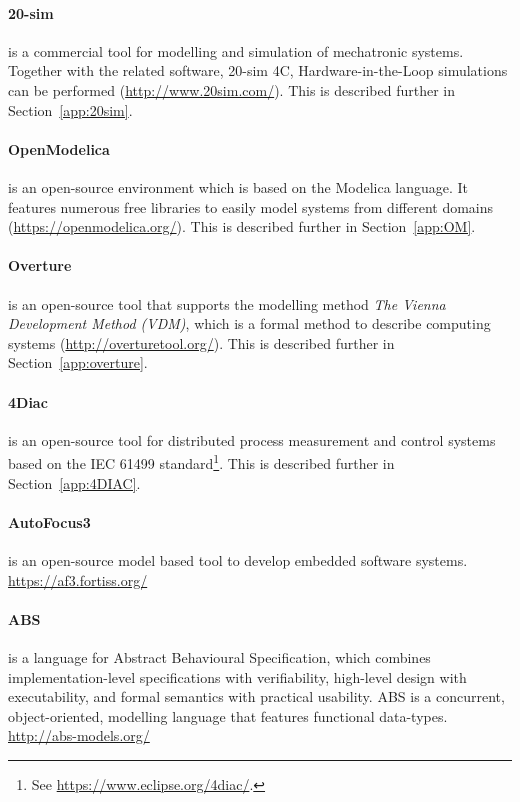 \paragraph{20-sim} is a commercial tool for modelling and simulation of mechatronic systems. Together with the related software, 20-sim 4C, Hardware-in-the-Loop simulations can be performed (\url{http://www.20sim.com/}). This is described further in Section~\ref{app:20sim}.

\paragraph{OpenModelica} is an open-source environment which is based on the Modelica language. It features numerous free libraries to easily model systems from different domains (\url{https://openmodelica.org/}). This is described further in Section~\ref{app:OM}.

\paragraph{Overture} is an open-source tool that supports the modelling method \textit{The Vienna Development Method (VDM)}, which is a formal method to describe computing systems (\url{http://overturetool.org/}). This is described further in Section~\ref{app:overture}.

\paragraph{4Diac} is an open-source tool for distributed process measurement and control systems based on the IEC 61499 standard\footnote{See \url{https://www.eclipse.org/4diac/}.}. This is described further in Section~\ref{app:4DIAC}.

\paragraph{AutoFocus3} is an open-source model based tool to develop embedded software systems. \url{https://af3.fortiss.org/}


\paragraph{ABS} is a language for Abstract Behavioural Specification, which combines implementation-level specifications with verifiability, high-level design with executability, and formal semantics with practical usability. ABS is a concurrent, object-oriented, modelling language that features functional data-types. \url{http://abs-models.org/}

